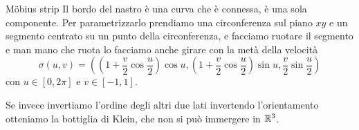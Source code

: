 \documentclass[a4paper]{article}
\begin{document}
\begin{snippetexample}{Möbius strip}
    Il bordo del nastro è una curva che è connessa, è una sola componente.
    Per parametrizzarlo prendiamo una circonferenza sul piano \(xy\)
    e un segmento centrato su un punto della circonferenza, e facciamo ruotare il segmento
    e man mano che ruota lo facciamo anche girare con la metà della velocità
    \[
        \sigma(u, v) =(
            \left(1 + \frac{v}{2}\cos \frac{u}{2}\right)\cos u,
            \left(1 + \frac{v}{2}\cos\frac{u}{2}\right)\sin u,
            \frac{v}{2} \sin\frac{u}{2}
        )
    \]
    con \(u \in [0,2\pi]\) e \(v \in [-1, 1]\).
\end{snippetexample}

Se invece invertiamo l'ordine degli altri due lati invertendo l'orientamento
otteniamo la bottiglia di Klein, che non si può immergere in \(\mathbb{R}^3\).

\end{document}
